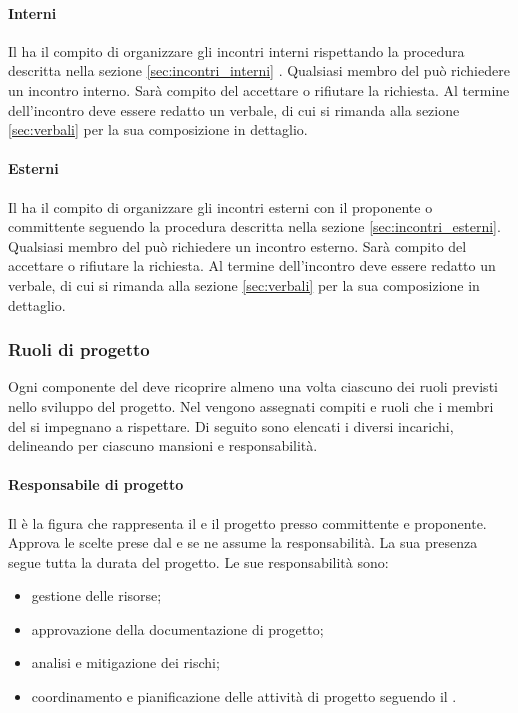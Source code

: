             \paragraph{Interni}
            Il \responsabilediprogetto{} ha il compito di organizzare gli incontri interni rispettando la procedura descritta nella sezione \ref{sec:incontri_interni} .
	        Qualsiasi membro del  può richiedere un incontro interno. Sarà compito del \responsabilediprogetto{} accettare o rifiutare la richiesta.
        	Al termine dell'incontro deve essere redatto un verbale, di cui si rimanda alla sezione \ref{sec:verbali} per la sua composizione in dettaglio.
            \paragraph{Esterni}
            Il \responsabilediprogetto{} ha il compito di organizzare gli incontri esterni con il proponente o committente seguendo la procedura descritta nella sezione \ref{sec:incontri_esterni}.
            Qualsiasi membro del  può richiedere un incontro esterno. Sarà compito del \responsabilediprogetto{} accettare o rifiutare la richiesta.
            Al termine dell'incontro deve essere redatto un verbale, di cui si rimanda alla sezione \ref{sec:verbali} per la sua composizione in dettaglio.
        \subsubsection{Ruoli di progetto}
        	Ogni componente del  deve ricoprire almeno una volta ciascuno dei ruoli previsti nello sviluppo del progetto. Nel \pdp{} vengono assegnati  compiti e ruoli che i membri del  si impegnano a rispettare. Di seguito sono elencati i diversi incarichi, delineando per ciascuno mansioni e responsabilità.
			\paragraph{Responsabile di progetto}
			Il \responsabilediprogetto{} è la figura che rappresenta il  e il progetto presso committente e proponente. Approva le scelte prese dal  e se ne assume la responsabilità. La sua presenza segue tutta la durata del progetto.
			Le sue responsabilità sono:
			\begin{itemize}
				\item gestione delle risorse;
				\item approvazione della documentazione di progetto;
				\item analisi e mitigazione dei rischi;
				\item coordinamento e pianificazione delle attività di progetto seguendo il \pdp{}.
			\end{itemize}

